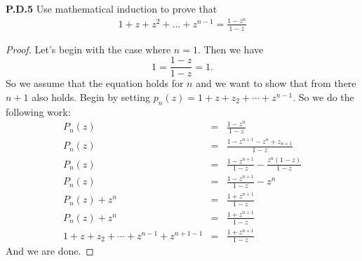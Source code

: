 \documentclass[12pt]{amsart}
\begin{document}
\begin{onehalfspace}
        \noindent\textbf{P.D.5} Use mathematical induction to prove that
        \begin{align*}
            1 + z + z^2 + \dots + z^{n-1} = \frac{1 - z^n}{1-z}
        \end{align*}
        \begin{proof}
            Let's begin with the case where $n = 1$. Then we have
            \begin{displaymath}
                1 = \frac{1-z}{1-z} = 1.
            \end{displaymath}
            So we assume that the equation holds for $n$ and we want to show that from there $n+1$ also holds. Begin by
            setting $p_n(z) = 1 + z + z_2 + \cdots + z^{n-1}$. So we do the following work:
            \begin{eqnarray*}
                P_n(z) & = & \frac{1 - z^n}{1-z} \\
                P_n(z) & = & \frac{1 - z^{n+1} - z^n + z_{n+1}}{1-z} \\
                P_n(z) & = & \frac{1-z^{n+1}}{1 - z} - \frac{z^n(1 - z)}{1 - z} \\
                P_n(z) & = & \frac{1 - z^{n+1}}{1 - z} - z^n \\
                P_n(z) + z^n & = & \frac{1 + z^{n+1}}{1 - z} \\
                P_n(z) + z^n & = & \frac{1 + z^{n+1}}{1 - z} \\
                1 + z + z_2 + \cdots + z^{n-1} + z^{n+1-1} & = & \frac{1 + z^{n+1}}{1 - z}
            \end{eqnarray*}
            And we are done.
        \end{proof}

    \end{onehalfspace}
\end{document}
